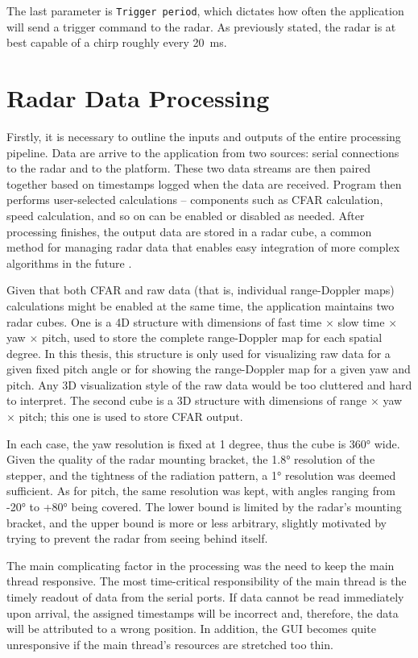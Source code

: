 The last parameter is \texttt{Trigger period}, which dictates how often the application will send a trigger command to the radar.
As previously stated, the radar is at best capable of a chirp roughly every 20~ms.

\chapter{Radar Data Processing}

Firstly, it is necessary to outline the inputs and outputs of the entire processing pipeline.
Data are arrive to the application from two sources: serial connections to the radar and to the platform.
These two data streams are then paired together based on timestamps logged when the data are received.
Program then performs user-selected calculations -- components such as CFAR calculation, speed calculation, and so on can be enabled or disabled as needed.
After processing finishes, the output data are stored in a radar cube, a common method for managing radar data that enables easy integration of more complex algorithms in the future \cite{richards2022}.

Given that both CFAR and raw data (that is, individual range-Doppler maps) calculations might be enabled at the same time, the application maintains two radar cubes.
One is a 4D structure with dimensions of fast time $\times$ slow time $\times$ yaw $\times$ pitch, used to store the complete range-Doppler map for each spatial degree.
In this thesis, this structure is only used for visualizing raw data for a given fixed pitch angle or for showing the range-Doppler map for a given yaw and pitch.
Any 3D visualization style of the raw data would be too cluttered and hard to interpret.
The second cube is a 3D structure with dimensions of range $\times$ yaw $\times$ pitch; this one is used to store CFAR output.

In each case, the yaw resolution is fixed at 1 degree, thus the cube is 360° wide.
Given the quality of the radar mounting bracket, the 1.8° resolution of the stepper, and the tightness of the radiation pattern, a 1° resolution was deemed sufficient.
As for pitch, the same resolution was kept, with angles ranging from -20° to +80° being covered.
The lower bound is limited by the radar's mounting bracket, and the upper bound is more or less arbitrary, slightly motivated by trying to prevent the radar from seeing behind itself.

The main complicating factor in the processing was the need to keep the main thread responsive.
The most time-critical responsibility of the main thread is the timely readout of data from the serial ports.
If data cannot be read immediately upon arrival, the assigned timestamps will be incorrect and, therefore, the data will be attributed to a wrong position.
In addition, the GUI becomes quite unresponsive if the main thread's resources are stretched too thin.

